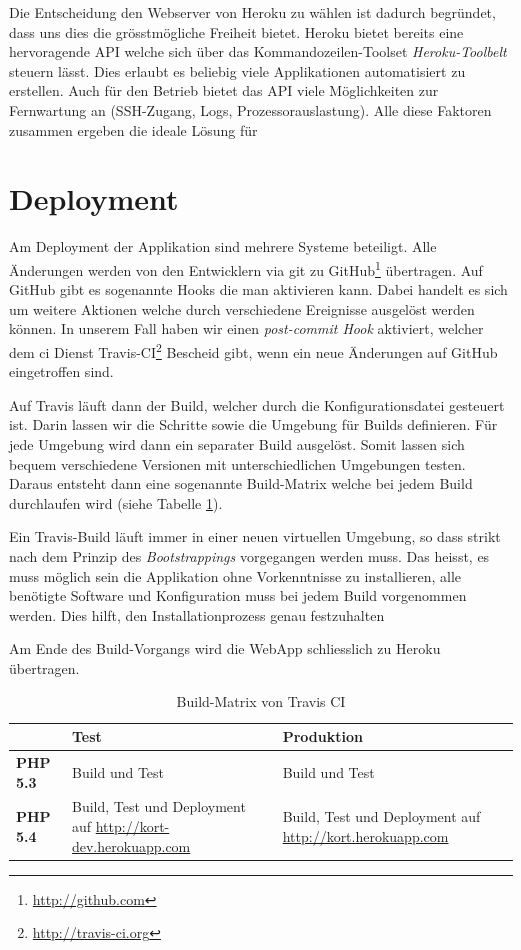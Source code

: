 Die Entscheidung den Webserver von Heroku zu wählen ist dadurch begründet, dass uns dies die grösstmögliche Freiheit bietet. 
Heroku bietet bereits eine hervoragende \gls{API} welche sich über das Kommandozeilen-Toolset \emph{Heroku-Toolbelt} steuern lässt.
Dies erlaubt es beliebig viele Applikationen automatisiert zu erstellen.
Auch für den Betrieb bietet das API viele Möglichkeiten zur Fernwartung an (SSH-Zugang, Logs, Prozessorauslastung).
Alle diese Faktoren zusammen ergeben die ideale Lösung für 

\section{Deployment}
Am Deployment der Applikation sind mehrere Systeme beteiligt. 
Alle Änderungen werden von den Entwicklern via \gls{git} zu GitHub\footnote{\url{http://github.com}} übertragen. 
Auf GitHub gibt es sogenannte Hooks die man aktivieren kann. 
Dabei handelt es sich um weitere Aktionen welche durch verschiedene Ereignisse ausgelöst werden können. 
In unserem Fall haben wir einen \emph{post-commit Hook} aktiviert, welcher dem \gls{ci} Dienst Travis-CI\footnote{\url{http://travis-ci.org}} Bescheid gibt, wenn ein neue Änderungen auf GitHub eingetroffen sind.

Auf Travis läuft dann der Build, welcher durch die Konfigurationsdatei  gesteuert ist. Darin lassen wir die Schritte sowie die Umgebung für Builds definieren. Für jede Umgebung wird dann ein separater Build ausgelöst. Somit lassen sich bequem verschiedene Versionen mit unterschiedlichen Umgebungen testen.
Daraus entsteht dann eine sogenannte Build-Matrix welche bei jedem Build durchlaufen wird (siehe Tabelle \ref{infrastruktur-build-matrix}).

Ein Travis-Build läuft immer in einer neuen virtuellen Umgebung, so dass strikt nach dem Prinzip des \emph{\gls{Bootstrapping}s} vorgegangen werden muss. Das heisst, es muss möglich sein die Applikation ohne Vorkenntnisse zu installieren, alle benötigte Software und Konfiguration muss bei jedem Build vorgenommen werden.
Dies hilft, den Installationprozess genau festzuhalten

Am Ende des Build-Vorgangs wird die \gls{WebApp} schliesslich zu Heroku übertragen. 

\begin{table}[H]
\centering
\begin{tabular}{|p{0.2\threecelltabwidth}|p{0.4\threecelltabwidth}|p{0.4\threecelltabwidth}|}
\hline 
 & \textbf{Test} & \textbf{Produktion} \\
\hline 
\textbf{PHP 5.3} & Build und Test & Build und Test \\
\hline 
\textbf{PHP 5.4} & Build, Test und Deployment auf \url{http://kort-dev.herokuapp.com} & Build, Test und Deployment auf \url{http://kort.herokuapp.com} \\
\hline 
\end{tabular} 
\caption{Build-Matrix von Travis CI}
\label{infrastruktur-build-matrix}
\end{table}

